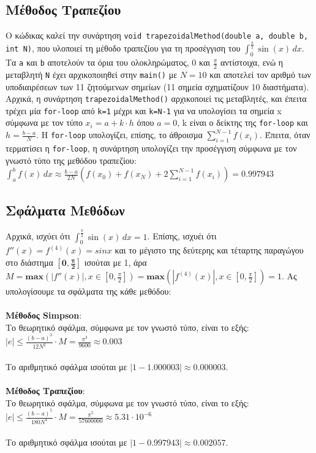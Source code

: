 \documentclass[a4paper, 14pt]{article}   %
\begin{document}
\subsection*{Μέθοδος Τραπεζίου}  %
	Ο κώδικας καλεί την συνάρτηση \texttt{void trapezoidalMethod(double a, double b, int N)}, που υλοποιεί τη μέθοδο τραπεζίου για τη προσέγγιση του $\int_{0}^{\frac{\pi}{2}} \sin(x) \,dx$. Τα  \texttt{a} και \texttt{b} αποτελούν τα όρια του ολοκληρώματος, 0 και $\frac{\pi}{2}$ αντίστοιχα, ενώ η μεταβλητή \texttt{N} έχει αρχικοποιηθεί στην \texttt{main()} με $N=10$ και αποτελεί τον αριθμό των υποδιαιρέσεων των 11 ζητούμενων σημείων (11 σημεία σχηματίζουν 10 διαστήματα). Αρχικά, η συνάρτηση \texttt{trapezoidalMethod()} αρχικοποιεί τις μεταβλητές, και έπειτα τρέχει μία \texttt{for-loop} από \texttt{k=1} μέχρι και \texttt{k=N-1} για να υπολογίσει τα σημεία x σύμφωνα με τον τύπο $x_i = a + k \cdot h$ όπου $a=0$, k είναι ο δείκτης της \texttt{for-loop} και $h = \frac{b-a}{N}$. Η \texttt{for-loop} υπολογίζει, επίσης, το άθροισμα $ \displaystyle\sum_{i=1}^{N-1} f(x_i)$. Έπειτα, όταν τερματίσει η \texttt{for-loop}, η συνάρτηση υπολογίζει την προσέγγιση σύμφωνα με τον γνωστό τύπο της μεθόδου τραπεζίου:\\$\displaystyle \int_{a}^{b} f(x) \,dx \approx \frac{b-a}{2N}(f(x_0) + f(x_N) + 2\sum_{i=1}^{N-1} f(x_i)) = 0.997943$

\subsection*{Σφάλματα Μεθόδων}  %
	Αρχικά, ισχύει ότι $\int_{0}^{\frac{\pi}{2}} \sin(x) \,dx = 1$. Επίσης, ισχυέι ότι $f''(x)=f^{(4)}(x)=sinx$ και το μέγιστο της δεύτερης  και τέταρτης παραγώγου στο διάστημα $\mathbf{[0, \frac{\pi}{2}]}$ ισούται με 1, άρα $M = \textbf{max}(|f''(x)|, x\in[0, \frac{\pi}{2}]) =\textbf{max}(|f^{(4)}(x)|, x\in[0, \frac{\pi}{2}]) = 1$. Ας υπολογίσουμε τα σφάλματα της κάθε μεθόδου:\\\\
\textbf{Μέθοδος Simpson}:\\
	Το θεωρητικό σφάλμα, σύμφωνα με τον γνωστό τύπο, είναι το εξής:\\
	$|e| \leq \frac{(b-a)^3}{12N^2} \cdot M =  \frac{\pi^3}{9600} \approx 0.003$\\\\
	Το αριθμητικό σφάλμα ισούται με $|1 - 1.000003| \approx 0.000003$.\\\\
\textbf{Μέθοδος Τραπεζίου}:\\
	Το θεωρητικό σφάλμα, σύμφωνα με τον γνωστό τύπο, είναι το εξής:\\
	$|e| \leq \frac{(b-a)^5}{180N^4} \cdot M =  \frac{\pi^5}{57600000} \approx 5.31 \cdot 10^{-6}$\\\\
	Το αριθμητικό σφάλμα ισούται με $|1 - 0.997943| \approx 0.002057$.\\\\
\end{document}

